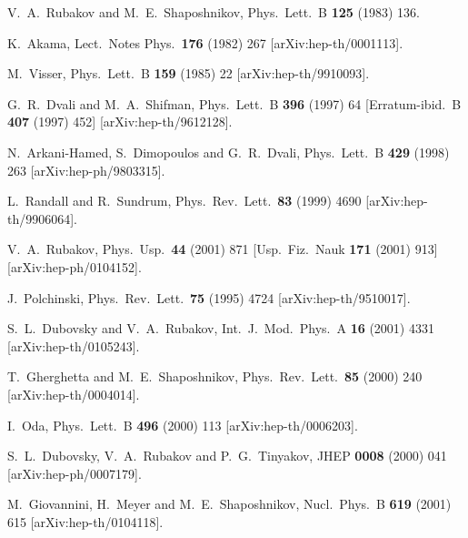 \documentclass[a4paper,12pt]{article}
\begin{document}
\begin{thebibliography}{99}

V.~A.~Rubakov and M.~E.~Shaposhnikov,
Phys.\ Lett.\ B {\bf 125} (1983) 136.

K.~Akama,
Lect.\ Notes Phys.\  {\bf 176} (1982) 267
[arXiv:hep-th/0001113].

M.~Visser,
Phys.\ Lett.\ B {\bf 159} (1985) 22
[arXiv:hep-th/9910093].

G.~R.~Dvali and M.~A.~Shifman,
Phys.\ Lett.\ B {\bf 396} (1997) 64
[Erratum-ibid.\ B {\bf 407} (1997) 452]
[arXiv:hep-th/9612128].

N.~Arkani-Hamed, S.~Dimopoulos and G.~R.~Dvali,
Phys.\ Lett.\ B {\bf 429} (1998) 263
[arXiv:hep-ph/9803315].

L.~Randall and R.~Sundrum,
Phys.\ Rev.\ Lett.\  {\bf 83} (1999) 4690
[arXiv:hep-th/9906064].

V.~A.~Rubakov,
Phys.\ Usp.\  {\bf 44} (2001) 871
[Usp.\ Fiz.\ Nauk {\bf 171} (2001) 913]
[arXiv:hep-ph/0104152].

J.~Polchinski,
Phys.\ Rev.\ Lett.\  {\bf 75} (1995) 4724
[arXiv:hep-th/9510017].

S.~L.~Dubovsky and V.~A.~Rubakov,
Int.\ J.\ Mod.\ Phys.\ A {\bf 16} (2001) 4331
[arXiv:hep-th/0105243].

T.~Gherghetta and M.~E.~Shaposhnikov,
Phys.\ Rev.\ Lett.\  {\bf 85} (2000) 240
[arXiv:hep-th/0004014].

I.~Oda,
Phys.\ Lett.\ B {\bf 496} (2000) 113
[arXiv:hep-th/0006203].

S.~L.~Dubovsky, V.~A.~Rubakov and P.~G.~Tinyakov,
JHEP {\bf 0008} (2000) 041
[arXiv:hep-ph/0007179].

M.~Giovannini, H.~Meyer and M.~E.~Shaposhnikov,
Nucl.\ Phys.\ B {\bf 619} (2001) 615
[arXiv:hep-th/0104118].


\end{thebibliography}
\end{document}
